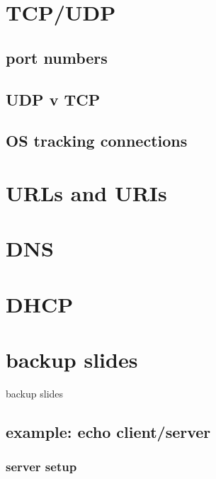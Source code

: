 

\section{TCP/UDP}

\subsection{port numbers}


\subsection{UDP v TCP}


\subsection{OS tracking connections}


\section{URLs and URIs}


\section{DNS}


\section{DHCP}



\section{backup slides}
\begin{frame}{backup slides}
\end{frame}

\subsection{example: echo client/server}
\subsubsection{server setup}

